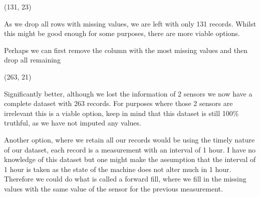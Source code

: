 \documentclass[letterpaper,10pt,english]{jupyterBook}
\begin{document}
\begin{sphinxVerbatim}[commandchars=\\\{\}]
\end{sphinxVerbatim}

\begin{sphinxVerbatim}[commandchars=\\\{\}]
(131, 23)
\end{sphinxVerbatim}

\sphinxAtStartPar
As we drop all rows with missing values, we are left with only 131 records.
Whilst this might be good enough for some purposes, there are more viable options.

\sphinxAtStartPar
Perhaps we can first remove the column with the most missing values and then drop all remaining

\begin{sphinxVerbatim}[commandchars=\\\{\}]
\PYG{p}{[}\PYG{p}{]}
\end{sphinxVerbatim}

\begin{sphinxVerbatim}[commandchars=\\\{\}]
(263, 21)
\end{sphinxVerbatim}

\sphinxAtStartPar
Significantly better, although we lost the information of 2 sensors we now have a complete dataset with 263 records. For purposes where those 2 sensors are irrelevant this is a viable option, keep in mind that this dataset is still 100\% truthful, as we have not imputed any values.

\sphinxAtStartPar
Another option, where we retain all our records would be using the timely nature of our dataset, each record is a measurement with an interval of 1 hour. I have no knowledge of this dataset but one might make the assumption that the interval of 1 hour is taken as the state of the machine does not alter much in 1 hour. Therefore we could do what is called a forward fill, where we fill in the missing values with the same value of the sensor for the previous measurement.
\end{document}
